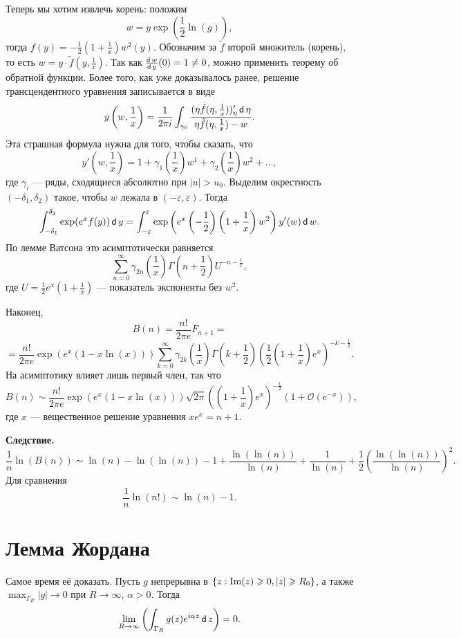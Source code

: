 Теперь мы хотим извлечь корень: положим
\[
    w = y \exp \left( \frac{1}{2} \ln(g) \right),
\]
тогда $f(y) = -\frac{1}{2} \left(1 + \frac{1}{x} \right) w^2(y)$.
Обозначим за $\tilde f$ второй множитель (корень), то есть $w = y \cdot \tilde f(y, \frac{1}{x})$.
Так как $\frac{\operatorname{\mathsf d} w}{\operatorname{\mathsf d} y}(0) = 1 \ne 0$, можно применить теорему об обратной функции.
Более того, как уже доказывалось ранее, решение трансцендентного уравнения записывается в виде
\[
    y \left(w, \frac{1}{x} \right) = \frac{1}{2\pi i} \int_{\gamma_0} \frac{(\eta \tilde f(\eta, \frac{1}{x}))'_\eta \operatorname{\mathsf d} \eta}{\eta \tilde f(\eta, \frac{1}{x}) - w}.
\]
Эта страшная формула нужна для того, чтобы сказать, что
\[
    y'\left(w, \frac{1}{x} \right) = 1 + \gamma_1 \left(\frac{1}{x} \right) w^1 + \gamma_2 \left( \frac{1}{x} \right) w^2 + \dots,
\]
где $\gamma_i$ --- ряды, сходящиеся абсолютно при $|u| > u_0$.
Выделим окрестность $(-\delta_1, \delta_2)$ такое, чтобы $w$ лежала в $(-\varepsilon, \varepsilon)$.
Тогда
\[
    \int_{-\delta_1}^{\delta_2} \exp(e^x f(y)) \operatorname{\mathsf d} y = \int_{-\varepsilon}^{\varepsilon} \exp \left( e^x \left(-\frac{1}{2} \right) \left(1 + \frac{1}{x} \right) w^2 \right) y'(w) \operatorname{\mathsf d} w.
\]
По лемме Ватсона это асимптотически равняется
\[
    \sum_{n=0}^{\infty} \gamma_{2n} \left( \frac{1}{x} \right) \Gamma\left(n + \frac{1}{2} \right) U^{-n - \frac{1}{x}},
\]
где $U = \frac{1}{2} e^x \left(1 + \frac{1}{x} \right)$ --- показатель экспоненты без $w^2$.

Наконец,
\[
    B(n) = \frac{n!}{2\pi e} F_{n+1} =
\]
\[
    = \frac{n!}{2\pi e} \exp (e^x (1 - x \ln(x))) \sum_{k=0}^{\infty} \gamma_{2k} \left( \frac{1}{x} \right) \Gamma \left(k + \frac{1}{2} \right) \left(\frac{1}{2} \left(1 + \frac{1}{x} \right) e^x \right)^{-k - \frac{1}{2}}.
\]
На асимптотику влияет лишь первый член, так что
\[
    B(n) \sim \frac{n!}{2\pi e} \exp(e^x(1 - x \ln(x))) \sqrt{2\pi} \left(\left(1 + \frac{1}{x} \right) e^x \right)^{-\frac{1}{2}} (1 + \mathcal O(e^{-x})),
\]
где $x$ --- вещественное решение уравнения $x e^x = n + 1$.

\textbf{Следствие.}
\[
    \frac{1}{n} \ln(B(n)) \sim \ln(n) - \ln(\ln(n)) - 1 + \frac{\ln(\ln(n))}{\ln(n)} + \frac{1}{\ln(n)} + \frac{1}{2} \left( \frac{\ln(\ln(n))}{\ln(n)} \right)^2.
\]
Для сравнения
\[
    \frac{1}{n} \ln(n!) \sim \ln(n) - 1.
\]

\section{Лемма Жордана}
Самое время её доказать.
Пусть $g$ непрерывна в $\{z: \operatorname{Im}(z) \geqslant 0, |z| \geqslant R_0\}$, а также $\max_{\Gamma_R} |g| \to 0$ при $R \to \infty$, $\alpha > 0$.
Тогда
\[
    \lim_{R \to \infty} \left( \int_{\Gamma_R} g(z) e^{i \alpha z} \operatorname{\mathsf d} z \right) = 0.
\]

